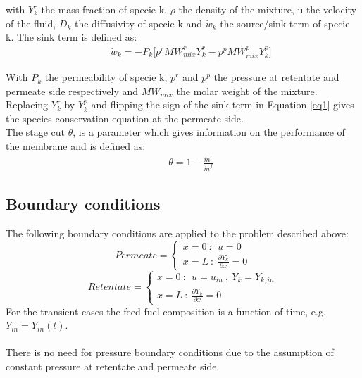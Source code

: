 with $Y^r_k$ the mass fraction of specie k, $\rho$ the density of the mixture, u the velocity of the fluid, $D_k$ the diffusivity of specie k and $\dot{w}_k$ the source/sink term of specie k.
The sink term is defined as:
\begin{align}
&&	\dot{w}_k = -P_k \Big[p^rMW^r_{mix}Y^r_k-p^pMW^p_{mix}Y^p_k\Big]
\label{eq1}
\end{align}

With $P_k$ the permeability of specie k, $p^r$ and $p^p$ the pressure at retentate and permeate side respectively and $MW_{mix}$ the molar weight of the mixture. Replacing $Y_k^r$ by $Y_k^p$ and flipping the sign of the sink term in Equation \ref{eq1} gives the species conservation equation at the permeate side. \\

The stage cut $\theta$, is a parameter which gives information on the performance of the membrane and is defined as:
\begin{align}
	&&	\theta = 1- \frac{\dot{m}^r}{\dot{m}^f}
\end{align}

\subsection{Boundary conditions}
The following boundary conditions are applied to the problem described above:
\[
Permeate =\begin{cases}
x = 0 \ : \ \ u = 0\\
x = L \ : \ \frac{\partial Y_k}{\partial x} = 0 
\end{cases}
\] 
\[
Retentate =\begin{cases}
x = 0 \ : \ \ u = u_{in} \ , \ Y_k = Y_{k,in}\\
x = L \ : \ \frac{\partial Y_k}{\partial x} = 0 
\end{cases}
\] 
For the transient cases the feed fuel composition is a function of time, e.g. $Y_{in} = Y_{in}(t)$. \\ \\  There is no need for pressure boundary conditions due to the assumption of constant pressure at retentate and permeate side. 
